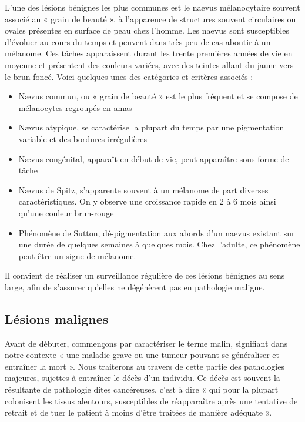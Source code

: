 L'une des lésions bénignes les plus communes est le naevus mélanocytaire souvent associé au « grain de beauté », à l’apparence de structures souvent circulaires ou ovales présentes en surface de peau chez l’homme. Les naevus sont susceptibles d’évoluer au cours du temps et peuvent dans très peu de cas aboutir à un mélanome. Ces tâches apparaissent durant les trente premières années de vie en moyenne et présentent des couleurs variées, avec des teintes allant du jaune vers le brun foncé. Voici quelques-unes des catégories et critères associés :
\begin{itemize}
\item Nævus commun, ou « grain de beauté » est le plus fréquent et se compose de mélanocytes regroupés en amas
\item Nævus atypique, se caractérise la plupart du temps par une pigmentation variable et des bordures irrégulières
\item Nævus congénital, apparaît en début de vie, peut apparaître sous forme de tâche
\item Nævus de Spitz, s’apparente souvent à un mélanome de part diverses caractéristiques. On y observe une croissance rapide en 2 à 6 mois ainsi qu’une couleur brun-rouge
\item Phénomène de Sutton, dé-pigmentation aux abords d’un naevus existant sur une durée de quelques semaines à quelques mois. Chez l’adulte, ce phénomène peut être un signe de mélanome.
\end{itemize}
Il convient de réaliser un surveillance régulière de ces lésions bénignes au sens large, afin de s'assurer qu'elles ne dégénèrent pas en pathologie maligne.\par

\subsection{Lésions malignes}
Avant de débuter, commençons par caractériser le terme malin, signifiant dans notre contexte « une maladie grave ou une tumeur pouvant se généraliser et entraîner la mort ». Nous traiterons au travers de cette partie des pathologies majeures, sujettes à entraîner le décès d’un individu. Ce décès est souvent la résultante de pathologie dites cancéreuses, c'est à dire « qui pour la plupart colonisent les tissus alentours, susceptibles de réapparaître après une tentative de retrait et de tuer le patient à moins d’être traitées de manière adéquate ».\par

